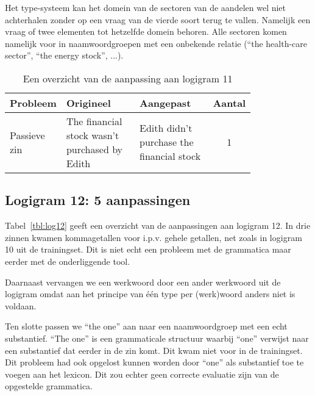 Het type-systeem kan het domein van de sectoren van de aandelen wel niet achterhalen zonder op een vraag van de vierde soort terug te vallen. Namelijk een vraag of twee elementen tot hetzelfde domein behoren. Alle sectoren komen namelijk voor in naamwoordgroepen met een onbekende relatie (``the health-care sector'', ``the energy stock'', ...).

\begin{table}[h]
  \centering
  \begin{tabular}{p{0.2\linewidth}p{0.3\linewidth}p{0.3\linewidth}c}
    \toprule
    \textbf{Probleem} & \textbf{Origineel} & \textbf{Aangepast} & \textbf{Aantal} \\ 
    \hline
    Passieve zin & The financial stock wasn't purchased by Edith & Edith didn't purchase the financial stock & 1\\
    \bottomrule
  \end{tabular}
  \caption{Een overzicht van de aanpassing aan logigram 11}
  \label{tbl:log11}
\end{table}

\subsection{Logigram 12: 5 aanpassingen}
Tabel~\ref{tbl:log12} geeft een overzicht van de aanpassingen aan logigram 12. In drie zinnen kwamen kommagetallen voor i.p.v. gehele getallen, net zoals in logigram 10 uit de trainingset. Dit is niet echt een probleem met de grammatica maar eerder met de onderliggende tool.

Daarnaast vervangen we een werkwoord door een ander werkwoord uit de logigram omdat aan het principe van één type per (werk)woord anders niet is voldaan.

Ten slotte passen we ``the one'' aan naar een naamwoordgroep met een echt substantief. ``The one'' is een grammaticale structuur waarbij ``one'' verwijst naar een substantief dat eerder in de zin komt. Dit kwam niet voor in de trainingset. Dit probleem had ook opgelost kunnen worden door ``one'' als substantief toe te voegen aan het lexicon. Dit zou echter geen correcte evaluatie zijn van de opgestelde grammatica.

